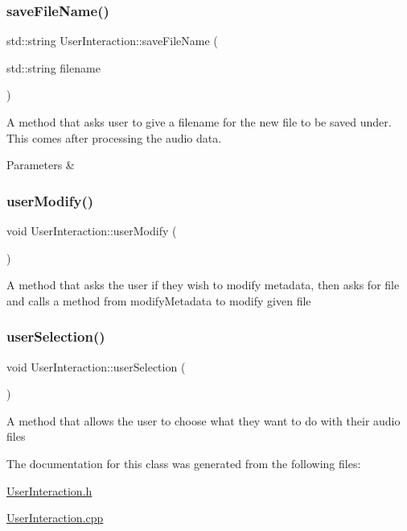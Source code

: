 \subsubsection{\texorpdfstring{save\+File\+Name()}{saveFileName()}}
{\footnotesize\ttfamily std\+::string User\+Interaction\+::save\+File\+Name (\begin{DoxyParamCaption}\item[{std\+::string}]{filename }\end{DoxyParamCaption})}

A method that asks user to give a filename for the new file to be saved under. This comes after processing the audio data. 
\begin{DoxyParams}{Parameters}
{\em } & \\
\hline
\end{DoxyParams}
\mbox{\label{classUserInteraction_ad019168c00904e9f57df69940e4873c0}} 
\subsubsection{\texorpdfstring{user\+Modify()}{userModify()}}
{\footnotesize\ttfamily void User\+Interaction\+::user\+Modify (\begin{DoxyParamCaption}{ }\end{DoxyParamCaption})}

A method that asks the user if they wish to modify metadata, then asks for file and calls a method from modify\+Metadata to modify given file \mbox{\label{classUserInteraction_af0f20f9766feea9312be9e1009e693b8}} 
\subsubsection{\texorpdfstring{user\+Selection()}{userSelection()}}
{\footnotesize\ttfamily void User\+Interaction\+::user\+Selection (\begin{DoxyParamCaption}{ }\end{DoxyParamCaption})}

A method that allows the user to choose what they want to do with their audio files 

The documentation for this class was generated from the following files\+:\begin{DoxyCompactItemize}
\item 
\hyperlink{UserInteraction_8h}{User\+Interaction.\+h}\item 
\hyperlink{UserInteraction_8cpp}{User\+Interaction.\+cpp}\end{DoxyCompactItemize}
